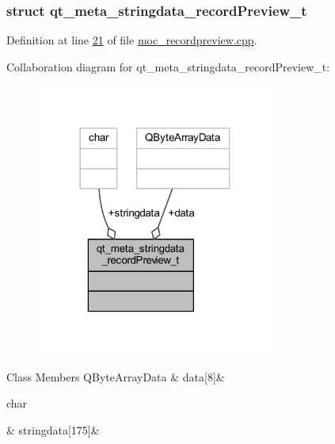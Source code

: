 \subsubsection{struct qt\+\_\+meta\+\_\+stringdata\+\_\+record\+Preview\+\_\+t}


Definition at line \hyperlink{a00017_source_l00021}{21} of file \hyperlink{a00017_source}{moc\+\_\+recordpreview.\+cpp}.



Collaboration diagram for qt\+\_\+meta\+\_\+stringdata\+\_\+record\+Preview\+\_\+t\+:
\nopagebreak
\begin{figure}[H]
\begin{center}
\leavevmode
\includegraphics[width=222pt]{da/deb/a00189}
\end{center}
\end{figure}
\begin{DoxyFields}{Class Members}
\hypertarget{a00017_a61be725f4f67b385a56830793423ff45}{Q\+Byte\+Array\+Data}\label{a00017_a61be725f4f67b385a56830793423ff45}
&
data\mbox{[}8\mbox{]}&
\\
\hline

\hypertarget{a00017_af0762b30c491f46fa9caf80c9ae5f6ca}{char}\label{a00017_af0762b30c491f46fa9caf80c9ae5f6ca}
&
stringdata\mbox{[}175\mbox{]}&
\\
\hline

\end{DoxyFields}


